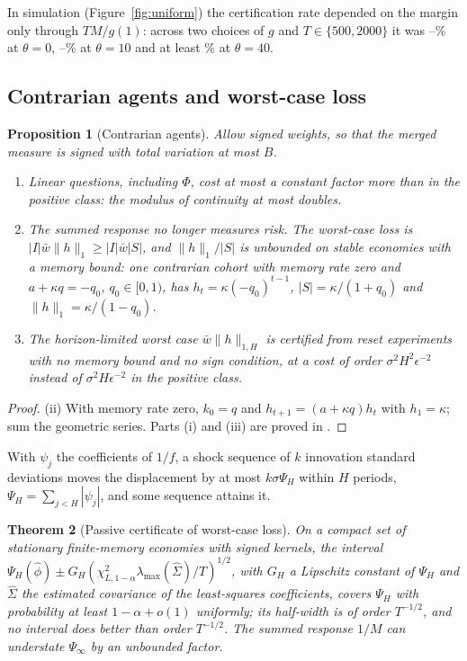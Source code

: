 \documentclass[12pt]{article}
\newtheorem{theorem}{Theorem}
\newtheorem{proposition}[theorem]{Proposition}
\theoremstyle{definition}
\theoremstyle{remark}
\begin{document}
In simulation (Figure~\ref{fig:uniform}) the certification rate depended on the margin only through $TM/g(1)$: across two choices of $g$ and $T\in\{500,2000\}$ it was \UniformPowerZero--\UniformPowerZeroHi\% at $\theta=0$, \UniformPowerTenLo--\UniformPowerTenHi\% at $\theta=10$ and at least \UniformPowerForty\% at $\theta=40$.

\subsection{Contrarian agents and worst-case loss}\label{sec:signed}

\begin{proposition}[Contrarian agents]\label{prop:signed}
Allow signed weights, so that the merged measure is signed with total variation at most $B$.
\begin{enumerate}[label=(\roman*)]
\item Linear questions, including $\Phi$, cost at most a constant factor more than in the positive class: the modulus of continuity at most doubles.
\item The summed response no longer measures risk. The worst-case loss is $|I|\bar w\|h\|_1\ge|I|\bar w|S|$, and $\|h\|_1/|S|$ is unbounded on stable economies with a memory bound: one contrarian cohort with memory rate zero and $a+\kappa q=-q_0$, $q_0\in[0,1)$, has $h_t=\kappa(-q_0)^{t-1}$, $|S|=\kappa/(1+q_0)$ and $\|h\|_1=\kappa/(1-q_0)$.
\item The horizon-limited worst case $\bar w\|h\|_{1,H}$ is certified from reset experiments with no memory bound and no sign condition, at a cost of order $\sigma^2H^2\epsilon^{-2}$ instead of $\sigma^2H\epsilon^{-2}$ in the positive class.
\end{enumerate}
\end{proposition}

\begin{proof}
(ii) With memory rate zero, $k_0=q$ and $h_{t+1}=(a+\kappa q)h_t$ with $h_1=\kappa$; sum the geometric series. Parts (i) and (iii) are proved in \citet[Proposition~4.9.1]{niroula2026thesis}.
\end{proof}

With $\psi_j$ the coefficients of $1/f$, a shock sequence of $k$ innovation standard deviations moves the displacement by at most $k\sigma\Psi_H$ within $H$ periods, $\Psi_H=\sum_{j<H}|\psi_j|$, and some sequence attains it.

\begin{theorem}[Passive certificate of worst-case loss]\label{thm:absresp}
On a compact set of stationary finite-memory economies with signed kernels, the interval $\Psi_H(\hat\phi)\pm G_H(\chi^2_{L,1-\alpha}\lambda_{\max}(\hat\Sigma)/T)^{1/2}$, with $G_H$ a Lipschitz constant of $\Psi_H$ and $\hat\Sigma$ the estimated covariance of the least-squares coefficients, covers $\Psi_H$ with probability at least $1-\alpha+o(1)$ uniformly; its half-width is of order $T^{-1/2}$, and no interval does better than order $T^{-1/2}$. The summed response $1/M$ can understate $\Psi_\infty$ by an unbounded factor.
\end{theorem}
\end{document}
